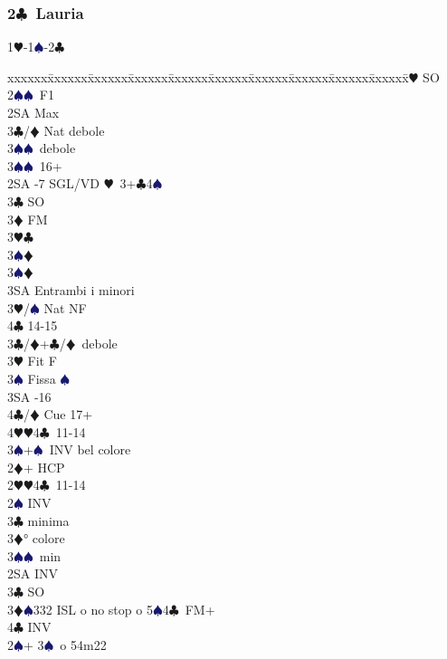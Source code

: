 \documentclass[a4paper,italian]{article}
\newcommand{\BC}{\textcolor{OliveGreen}{$\clubsuit$}}
\newcommand{\BD}{\textcolor{RedOrange}{$\vardiamondsuit$}}
\newcommand{\BH}{\textcolor{Red2}{$\varheartsuit${}}}
\newcommand{\BS}{\textcolor{MidnightBlue}{$\spadesuit${}}}
\newcommand{\pdfc}{\texorpdfstring{\BC{}}{C}}
\newenvironment{bidtable}
{\begin{tabbing}

    xxxxxx\=xxxxxx\=xxxxxx\=xxxxxx\=xxxxxx\=xxxxxx\=xxxxxx\=xxxxxx\=xxxxxx\=xxxxxx\=\kill}
{\end{tabbing} }%
\begin{document}
\begin{multicols*}{2}
    \subsubsection{2\pdfc\ Lauria} \label{lauria}

    1\BH-1\BS-2\BC
    \begin{bidtable}
        2\BH \> SO\+\\
        2\BS {}\BS\ F1\+\\
        2SA \> Max\\
        3\BC/\BD \> Nat debole\\
        3\BS {}\BS\ debole\-\\
        3\BS {}\BS\ 16+\-\\
        2SA -7 SGL/VD \BH\ 3+\BC 4\BS \+\\
        3\BC \> SO\\
        3\BD \> FM\+\\
        3\BH {}\BC \+\\
        3\BS {}\BD \-\\
        3\BS {}\BD \\
        3SA \> Entrambi i minori\-\\
        3\BH/\BS \> Nat NF\\
        4\BC {} 14-15\-\\
        3\BC/\BD {}+\BC /\BD\ debole\\
        3\BH \> Fit F\+\\
        3\BS \> Fissa \BS\\
        3SA -16\\
        4\BC/\BD \> Cue 17+\\
        4\BH {}\BH 4\BC\ 11-14\-\\
        3\BS {}+\BS\ INV bel colore\\
        2\BD {}+ HCP\+\\
        2\BH {}\BH 4\BC\ 11-14\+\\
        2\BS \> INV\+\\
        3\BC {} minima\\
        3\BD {}° colore\\
        3\BS {}\BS\ min\-\\
        2SA \> INV\\
        3\BC \> SO\\
        3\BD {}\BS 332 ISL o no stop o 5\BS 4\BC\ FM+\\
        4\BC \> INV\-\\
        2\BS {}+ 3\BS\ o 54m22\+\\

\end{bidtable}
\end{multicols*}
\end{document}
